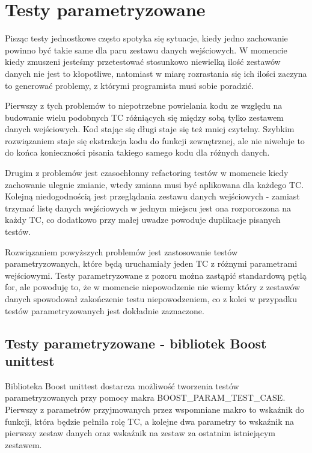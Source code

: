 \documentclass[12pt,a4paper,notitlepage]{report}
\begin{document}
\section{Testy parametryzowane}

Pisząc testy jednostkowe często spotyka się sytuacje, kiedy jedno zachowanie powinno być takie same dla paru zestawu danych wejściowych. W momencie kiedy zmuszeni jesteśmy przetestować stosunkowo niewielką ilość zestawów danych nie jest to kłopotliwe, natomiast w miarę rozrastania się ich ilości zaczyna to generować problemy, z którymi programista musi sobie poradzić.

Pierwszy z tych problemów to niepotrzebne powielania kodu ze względu na budowanie wielu podobnych TC różniących się między sobą tylko zestawem danych wejściowych. Kod stając się długi staje się też mniej czytelny.
Szybkim rozwiązaniem staje się ekstrakcja kodu do funkcji zewnętrznej, ale nie niweluje to do końca konieczności pisania takiego samego kodu dla różnych danych.

Drugim z problemów jest czasochłonny refactoring testów w momencie kiedy zachowanie ulegnie zmianie, wtedy zmiana musi być aplikowana dla każdego TC.
Kolejną niedogodnością jest przeglądania zestawu danych wejściowych - zamiast trzymać listę danych wejściowych w jednym miejscu jest ona rozporoszona na każdy TC, co dodatkowo przy małej uwadze powoduje duplikacje pisanych testów.

Rozwiązaniem powyższych problemów jest zastosowanie testów parametryzowanych, które będą uruchamiały jeden TC z różnymi parametrami wejściowymi. 
Testy parametryzowane z pozoru można zastąpić standardową pętlą for, ale powoduję to, że w momencie niepowodzenie nie wiemy który z zestawów danych spowodował zakończenie testu niepowodzeniem, co z kolei w przypadku testów parametryzowanych jest dokładnie zaznaczone.

\subsection{Testy parametryzowane - bibliotek Boost unittest}

Biblioteka Boost unittest dostarcza możliwość tworzenia testów parametryzowanych przy pomocy makra BOOST{\_}PARAM{\_}TEST{\_}CASE.
Pierwszy z parametrów przyjmowanych przez wspomniane makro to wskaźnik do funkcji, która będzie pełniła rolę TC, a kolejne dwa parametry to wskaźnik na pierwszy zestaw danych oraz wskaźnik na zestaw za ostatnim istniejącym zestawem.
\end{document}
